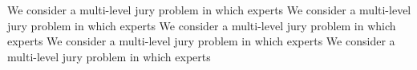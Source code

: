 \documentclass[letterpaper]{article}
\theoremstyle{definition}
\begin{document}






We consider a multi-level jury problem in which experts
We consider a multi-level jury problem in which experts
We consider a multi-level jury problem in which experts
We consider a multi-level jury problem in which experts
We consider a multi-level jury problem in which experts
\clearpage

\end{document}
